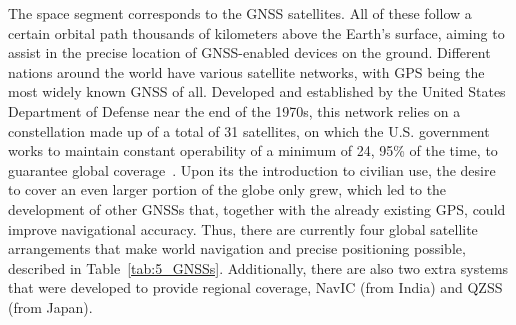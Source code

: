The space segment corresponds to the GNSS satellites. All of these follow a certain orbital path thousands of kilometers above the Earth's surface, aiming to assist in the precise location of GNSS-enabled devices on the ground.
Different nations around the world have various satellite networks, with GPS being the most widely known GNSS of all. Developed and established by the United States Department of Defense near the end of the 1970s, this network relies on a constellation made up of a total of 31 satellites, on which the U.S. government works to maintain constant operability of a minimum of 24, 95\% of the time, to guarantee global coverage~\cite{gps_USGov}.
Upon its the introduction to civilian use, the desire to cover an even larger portion of the globe only grew, which led to the development of other GNSSs that, together with the already existing GPS, could improve navigational accuracy. Thus, there are currently four global satellite arrangements that make world navigation and precise positioning possible, described in Table~\ref{tab:5_GNSSs}.
Additionally, there are also two extra systems that were developed to provide regional coverage, NavIC (from India) and QZSS (from Japan).


